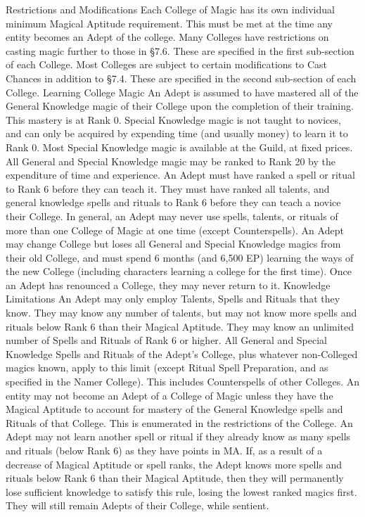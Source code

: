 \documentclass[a4paper]{article}
\begin{document}
\begin{multicols}{3}
Restrictions and Modifications
Each College of Magic has its own individual
minimum Magical Aptitude requirement. This
must be met at the time any entity becomes an
Adept of the college. Many Colleges have restrictions on casting magic further to those in §7.6.
These are specified in the first sub-section of each
College.
Most Colleges are subject to certain modifications
to Cast Chances in addition to §7.4. These are
specified in the second sub-section of each College.
Learning College Magic
An Adept is assumed to have mastered all of the
General Knowledge magic of their College upon
the completion of their training. This mastery is at
Rank 0. Special Knowledge magic is not taught to
novices, and can only be acquired by expending
time (and usually money) to learn it to Rank 0.
Most Special Knowledge magic is available at the
Guild, at fixed prices. All General and Special
Knowledge magic may be ranked to Rank 20 by
the expenditure of time and experience.
An Adept must have ranked a spell or ritual to
Rank 6 before they can teach it. They must have
ranked all talents, and general knowledge spells
and rituals to Rank 6 before they can teach a novice their College.
In general, an Adept may never use spells, talents,
or rituals of more than one College of Magic at one
time (except Counterspells). An Adept may change
College but loses all General and Special Knowledge magics from their old College, and must
spend 6 months (and 6,500 EP) learning the ways
of the new College (including characters learning a
college for the first time). Once an Adept has renounced a College, they may never return to it.
Knowledge Limitations
An Adept may only employ Talents, Spells and
Rituals that they know. They may know any number of talents, but may not know more spells and
rituals below Rank 6 than their Magical Aptitude.
They may know an unlimited number of Spells and
Rituals of Rank 6 or higher. All General and Special Knowledge Spells and Rituals of the Adept’s
College, plus whatever non-Colleged magics
known, apply to this limit (except Ritual Spell
Preparation, and as specified in the Namer College). This includes Counterspells of other Colleges.
An entity may not become an Adept of a College
of Magic unless they have the Magical Aptitude to
account for mastery of the General Knowledge
spells and Rituals of that College. This is enumerated in the restrictions of the College. An Adept
may not learn another spell or ritual if they already
know as many spells and rituals (below Rank 6) as
they have points in MA.
If, as a result of a decrease of Magical Aptitude or
spell ranks, the Adept knows more spells and rituals below Rank 6 than their Magical Aptitude, then
they will permanently lose sufficient knowledge to
satisfy this rule, losing the lowest ranked magics
first. They will still remain Adepts of their College,
while sentient.


\end{multicols}
\end{document}
